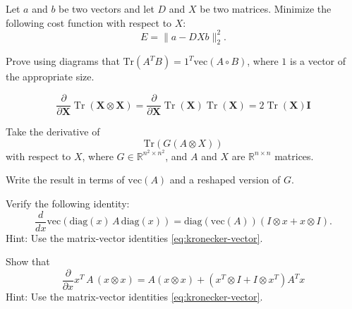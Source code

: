 \begin{exercise}
   Let $a$ and $b$ be two vectors and let $D$ and $X$ be two matrices.
   Minimize the following cost function with respect to $X$:
   \[
      E = \|a - D X b\|_2^2.
   \]
\end{exercise}

\begin{exercise}
   Prove using diagrams that $\mathrm{Tr}(A^T B) = 1^T \mathrm{vec}(A \circ B)$,
   where $1$ is a vector of the appropriate size.
\end{exercise}

\begin{exercise}
   \[\frac{\partial}{\partial \mathbf{X}} \operatorname{Tr}(\mathbf{X} \otimes \mathbf{X})=\frac{\partial}{\partial \mathbf{X}} \operatorname{Tr}(\mathbf{X}) \operatorname{Tr}(\mathbf{X})=2 \operatorname{Tr}(\mathbf{X}) \mathbf{I}\]
\end{exercise}

\begin{exercise}
   Take the derivative of
   \[
      \mathrm{Tr}(G (A \otimes X))
   \]
   with respect to $X$, where $G \in \mathbb{R}^{n^2 \times n^2}$,
   and $A$ and $X$ are $\mathbb R^{n \times n}$ matrices.

   Write the result in terms of $\mathrm{vec}(A)$ and a reshaped version of $G$.
\end{exercise}

\begin{exercise}
   Verify the following identity:
   \[
      \frac{d}{dx}
      \mathrm{vec}(
         \mathrm{diag}(x)\, A\, \mathrm{diag}(x)
         )
         = \mathrm{diag}(\mathrm{vec}(A)) (I \otimes x + x \otimes I)
         .
   \]
      Hint: Use the matrix-vector identities \eqref{eq:kronecker-vector}.
\end{exercise}

\begin{exercise}
      Show that
      \[
         \frac{\partial}{\partial x} x^T\, A\, (x \otimes x)
         =
         A(x\otimes x) + (x^T \otimes I + I \otimes x^T) A^T x
      \]
      Hint: Use the matrix-vector identities \eqref{eq:kronecker-vector}.
\end{exercise}

